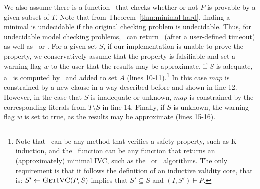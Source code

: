 We also assume there is a function \isadeq\ that checks whether or
not $P$ is provable by a given subset of $T$.  Note that from Theorem~\ref{thm:minimal-hard}, finding a minimal is undecidable if the original checking problem is undecidable.  Thus, for undecidable model checking problems, \isadeq\  can return \unknown ~(after a user-defined timeout) as well as \adequate\ or \inadequate.
For a given set $S$, if our implementation is unable to prove the property, we conservatively assume that the property is falsifiable and set a warning flag $w$ to the user that the results may be approximate.  %
if $S$ is adequate, a \mivc
~is computed by \getivc ~and added to set $A$ (lines 10-11).\footnote{Note
  that \isadeq ~can be any method that verifies a safety property,
  such as K-induction, and the \getivc\ function can be any function
  that returns an (approximately) minimal IVC, such as the \ucalg\ or
  \ucbfalg\ algorithms. The only requirement is
  that it follows the definition of an inductive validity core, that
  is: $S' \leftarrow \textsc{GetIVC} (P, S)$ implies that $S' \subseteq S$ and
  $(I, S') \vdash P$.} In this case $map$ is constrained by a new
clause in a way described before and shown in line 12. However, in the
case that $S$ is inadequate or unknown, $map$ is constrained by the corresponding
literals from $T \setminus S$ in line 14.  Finally, if $S$ is unknown, the warning flag $w$ is set to true, as the results may be approximate (lines 15-16).

